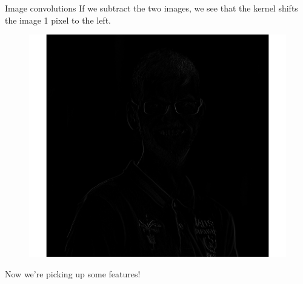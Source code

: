 \documentclass{beamer}
\begin{document}
\begin{frame}{Image convolutions}
If we subtract the two images, we see that the kernel shifts the image 1 pixel to the left. 

\begin{figure}
\includegraphics[width=0.5\linewidth]{Images/conv4.png}
\end{figure}
Now we're picking up some features!
\end{frame}
\end{document}

